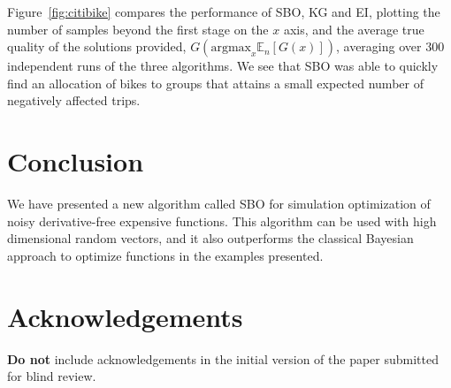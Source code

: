 \documentclass{article}
\begin{document}
Figure~\ref{fig:citibike} compares the performance of SBO, KG and EI, plotting the number of samples beyond the first stage on the $x$ axis, and the average true quality of the solutions provided, $G(\mathrm{argmax}_x \mathbb{E}_n[G(x)])$, averaging over 300 independent runs of the three algorithms. We see that SBO was able to quickly find an allocation of bikes to groups that attains a small expected number of negatively affected trips. 






\section{Conclusion}
\label{conclusion}
We have presented a new algorithm called SBO for simulation optimization of noisy derivative-free expensive functions. This algorithm can be used with high dimensional random vectors, and it also outperforms the classical Bayesian approach to optimize functions in the examples presented. 


\section*{Acknowledgements} 
 
\textbf{Do not} include acknowledgements in the initial version of
the paper submitted for blind review.

\nocite{langley00}



\end{document}
